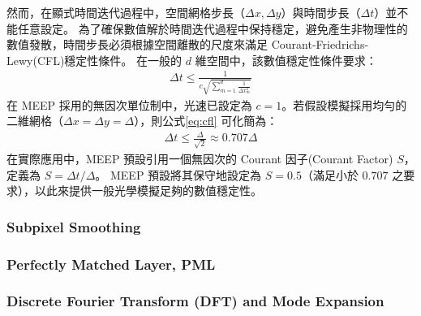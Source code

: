 然而，在顯式時間迭代過程中，空間網格步長（$\Delta x, \Delta y$）與時間步長（$\Delta t$）並不能任意設定。
為了確保數值解於時間迭代過程中保持穩定，避免產生非物理性的數值發散，時間步長必須根據空間離散的尺度來滿足 Courant-Friedrichs-Lewy(CFL)穩定性條件。
在一般的 $d$ 維空間中，該數值穩定性條件要求：
\begin{align}
\Delta t \le \frac{1}{c \sqrt{ \sum_{m=1}^{d} \frac{1}{\Delta x_m^2} }}
\label{eq:cfl}
\end{align}
在 MEEP 採用的無因次單位制中，光速已設定為 $c = 1$。若假設模擬採用均勻的二維網格（$\Delta x = \Delta y = \Delta$），則公式\eqref{eq:cfl} 可化簡為：
\begin{align}
\Delta t \le \frac{\Delta}{\sqrt{2}} \approx 0.707 \Delta
\end{align}
在實際應用中，MEEP 預設引用一個無因次的 Courant 因子(Courant Factor) $S$，定義為 $S = \Delta t / \Delta$。
MEEP 預設將其保守地設定為 $S = 0.5$（滿足小於 $0.707$ 之要求），以此來提供一般光學模擬足夠的數值穩定性。




\subsubsection{Subpixel Smoothing}

\subsubsection{Perfectly Matched Layer, PML}

\subsubsection{Discrete Fourier Transform (DFT) and Mode Expansion}